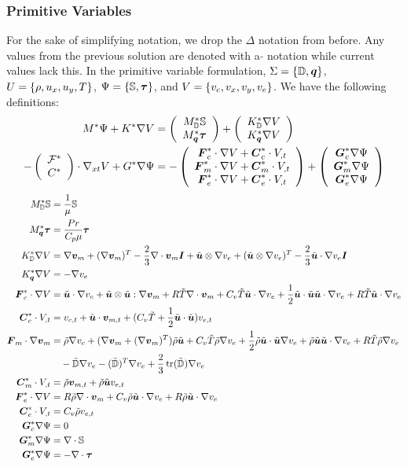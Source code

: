 \documentclass{article}
\begin{document}
\subsubsection*{Primitive Variables}
For the sake of simplifying notation, we drop the $\Delta$ notation from before. 
Any values from the previous solution are denoted with a $\tilde{}$ notation while current values lack this.
In the primitive variable formulation, $\Sigma=\left\{ \mathbb{D},\boldsymbol q \right\}$, $U=\left\{ \rho,u_x,u_y,T \right\}$, $\Psi=\left\{ \mathbb{S},\boldsymbol\tau \right\}$, and $V=\left\{ v_c,v_x,v_y,v_e \right\}$.
We have the following definitions:
\begin{align*}
M^*\Psi+K^*\nabla V&=\left( \begin{array}{c} M_{\mathbb{D}}^*\mathbb{S}\\ M_{\boldsymbol q}^*\boldsymbol\tau\\ \end{array} \right)
+\left( \begin{array}{c} K_{\mathbb{D}}^*\nabla V\\ K_{\boldsymbol q}^*\nabla V\\ \end{array} \right)\\
-\left( \begin{array}{c} \mathcal{F}^*\\ C^*\\ \end{array} \right)\cdot\nabla_{xt} V+G^*\nabla\Psi&=-\left( \begin{array}{c} \boldsymbol F_c^*\cdot\nabla V+\boldsymbol C_c^*\cdot V_{,t}\\ \boldsymbol F_m^*\cdot\nabla V+\boldsymbol C_m^*\cdot V_{,t}\\ \boldsymbol F_e^*\cdot\nabla V+\boldsymbol C_e^*\cdot V_{,t}\\ \end{array} \right)
+\left( \begin{array}{c} \boldsymbol G_c^*\nabla\Psi\\ \boldsymbol G_m^*\nabla\Psi\\ \boldsymbol G_e^*\nabla\Psi\\ \end{array} \right)
\end{align*}
\begin{align*}
M_\mathbb{D}^*\mathbb{S}&=\frac{1}{\mu}\mathbb{S}\\
M_{\bfq}^*\bftau&=\frac{Pr}{C_p\mu}\bftau\\
K_\mathbb{D}^*\Grad V&=\Grad\bfv_m+(\Grad\bfv_m)^T-\frac{2}{3}\Div\bfv_m\bfI
+\tilde\bfu\otimes\Grad v_e+(\tilde\bfu\otimes\Grad v_e)^T-\frac{2}{3}\tilde\bfu\cdot\Grad v_e\bfI\\
K_{\bfq}^*\Grad V&=-\Grad v_e\\
\bfF_c^*\cdot\Grad V&=
\tilde\bfu\cdot\Grad v_c
+\tilde\bfu\otimes\tilde\bfu:\Grad\bfv_m+R\tilde T\Div\bfv_m
+C_v\tilde T\tilde\bfu\cdot\Grad v_e+\frac{1}{2}\tilde\bfu\cdot\tilde\bfu\tilde\bfu\cdot\Grad v_e+R\tilde T\tilde\bfu\cdot\Grad v_e\\
%
\bfC_c^*\cdot V_{,t}&=v_{c,t}+\tilde\bfu\cdot\bfv_{m,t}+(C_v\tilde T+\frac{1}{2}\tilde\bfu\cdot\tilde\bfu)v_{e,t}\\
%
\bfF_m\cdot\Grad\bfv_m&=\tilde\rho\Grad v_c
+(\Grad\bfv_m+(\Grad\bfv_m)^T)\tilde\rho\tilde\bfu
+C_v\tilde T\tilde\rho\Grad v_e+\frac{1}{2}\tilde\rho\tilde\bfu\cdot\tilde\bfu\Grad v_e+\tilde\rho\tilde\bfu\tilde\bfu\cdot\Grad v_e
+R\tilde T\tilde\rho\Grad v_e\\ 
&\quad-\tilde{\mathbb{D}}\Grad v_e-(\tilde{\mathbb{D}})^T\Grad v_e+\frac{2}{3}\trace(\tilde{\mathbb{D}})\Grad v_e
\\
%
\bfC_m^*\cdot V_{,t}&=\tilde\rho\bfv_{m,t}+\tilde\rho\tilde\bfu v_{e,t}\\
%
\bfF_e^*\cdot\Grad V&=R\tilde\rho\Div\bfv_m+C_v\tilde\rho\tilde\bfu\cdot\Grad v_e+R\tilde\rho\tilde\bfu\cdot\Grad v_e\\
%
\bfC_e^*\cdot V_{,t}&=C_v\tilde\rho v_{e,t}\\
%
\bfG_c^*\Grad\Psi&=0\\
%
\bfG_m^*\Grad\Psi&=\Div\mathbb{S}\\
%
\bfG_e^*\Grad\Psi&=-\Div\bftau
\end{align*}
\end{document}
